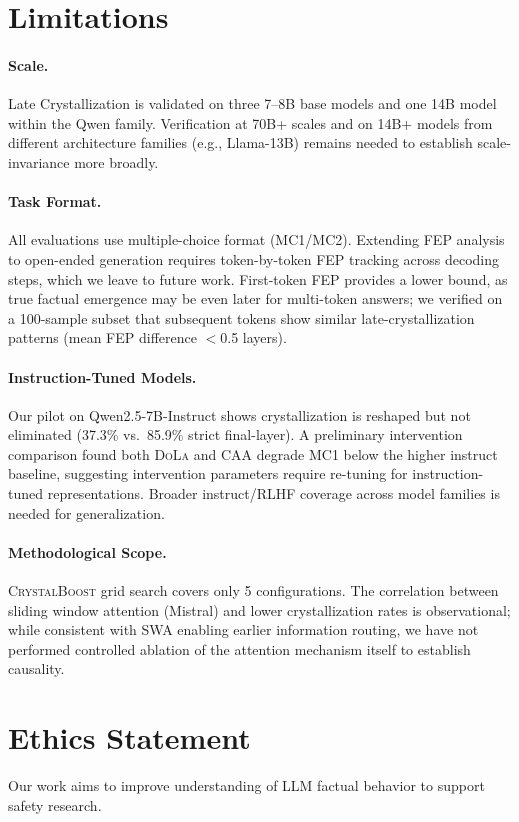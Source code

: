\documentclass{article}
\newcommand{\dola}{\textsc{DoLa}}
\newcommand{\crystalboost}{\textsc{CrystalBoost}}
\newcommand{\caa}{\textsc{CAA}}
\begin{document}
\section*{Limitations}

\paragraph{Scale.} Late Crystallization is validated on three 7--8B base models and one 14B model within the Qwen family. Verification at 70B+ scales and on 14B+ models from different architecture families (e.g., Llama-13B) remains needed to establish scale-invariance more broadly.

\paragraph{Task Format.} All evaluations use multiple-choice format (MC1/MC2). Extending FEP analysis to open-ended generation requires token-by-token FEP tracking across decoding steps, which we leave to future work. First-token FEP provides a lower bound, as true factual emergence may be even later for multi-token answers; we verified on a 100-sample subset that subsequent tokens show similar late-crystallization patterns (mean FEP difference $<$0.5 layers).

\paragraph{Instruction-Tuned Models.} Our pilot on Qwen2.5-7B-Instruct shows crystallization is reshaped but not eliminated (37.3\% vs.\ 85.9\% strict final-layer). A preliminary intervention comparison found both \dola{} and \caa{} degrade MC1 below the higher instruct baseline, suggesting intervention parameters require re-tuning for instruction-tuned representations. Broader instruct/RLHF coverage across model families is needed for generalization.

\paragraph{Methodological Scope.} \crystalboost{} grid search covers only 5 configurations. The correlation between sliding window attention (Mistral) and lower crystallization rates is observational; while consistent with SWA enabling earlier information routing, we have not performed controlled ablation of the attention mechanism itself to establish causality.

\section*{Ethics Statement}
Our work aims to improve understanding of LLM factual behavior to support safety research.
\end{document}
